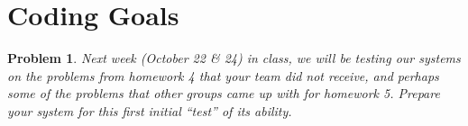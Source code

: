\documentclass{article}
\newtheorem{problem}{Problem}
\begin{document}
\newpage

\section{Coding Goals}

\begin{problem}
    Next week (October 22 \& 24) in class, we will be testing our systems on the problems from homework 4 that your team did not receive, and perhaps some of the problems that other groups came up with for homework 5. Prepare your system for this first initial ``test'' of its ability. 
\end{problem}
\end{document}
